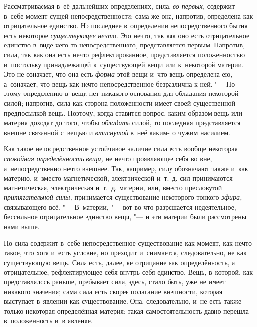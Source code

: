 
Рассматриваемая в~её дальнейших определениях,
сила, {\em во-первых,} содержит в~себе момент сущей
непосредственности; сама же она, напротив, определена как отрицательное
единство. Но последнее в~определении непосредственного бытия есть некоторое
{\em существующее} {\em нечто}. Это
нечто, так как оно есть отрицательное единство в~виде чего-то
непосредственного, представляется первым. Напротив, сила, так как она есть
нечто рефлектированное, представляется положенностью и~постольку
принадлежащей к~существующей вещи или к~некоторой материи. Это не означает,
что она есть {\em форма} этой вещи и~что вещь
определена ею, а~означает, что вещь как нечто непосредственное безразлична
к ней. "--- По этому определению в~вещи нет никакого основания для обладания
некоторой силой; напротив, сила как сторона положенности имеет своей
существенной предпосылкой вещь. Поэтому, когда ставится вопрос, каким
образом вещь или материя доходят до того, чтобы
{\em обладать} силой, то последняя представляется
внешне связанной с~вещью и {\em втиснутой} в~неё
каким-то чужим насилием.

Как такое непосредственное устойчивое наличие сила есть вообще некоторая
{\em спокойная определённость вещи,} не нечто
проявляющее себя во вне, а~непосредственно нечто внешнее. Так, например,
силу обозначают также и~как материю, и~вместо магнетической, электрической
и~т.~д. сил принимаются магнетическая, электрическая и~т.~д. материи, или,
вместо пресловутой {\em притягательной силы,}
принимается существование некоторого тонкого
{\em эфира,} связывающего всё. "--- В~материи, "--- вот во
что разрешается недеятельное, бессильное отрицательное единство вещи, "--- и
эти материи были рассмотрены нами выше.

Но сила содержит в~себе непосредственное существование как момент, как нечто
такое, что хотя и~есть условие, но преходит и~снимается, следовательно, не
как существующую вещь. Сила есть, далее, не отрицание как определённость, а
отрицательное, рефлектирующее себя внутрь себя единство. Вещь, в~которой,
как представлялось раньше, пребывает сила, здесь, стало быть, уже не имеет
никакого значения; сама сила есть скорее полагание внешности, которая
выступает в~явлении как существование. Она, следовательно, и~не есть также
только некоторая определённая материя; такая самостоятельность давно
перешла в~положенность и~в явление.

